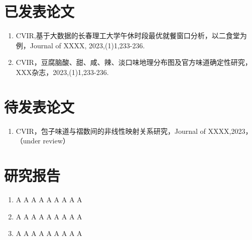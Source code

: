 
\begin{publications}

\section*{已发表论文}

\begin{enumerate}
    \item CVIR,基于大数据的长春理工大学午休时段最优就餐窗口分析，以二食堂为例，Journal of XXXX, 2023,(1)1,233-236.
    \item CVIR，豆腐脑酸、甜、咸、辣、淡口味地理分布图及官方味道确定性研究，XXX杂志，2023,(1)1,233-236.
    \end{enumerate}
    
    \section*{待发表论文}
    
    \begin{enumerate}
    \item CVIR，包子味道与褶数间的非线性映射关系研究，Journal of XXXX,2023，（under review）
    \end{enumerate}

\section*{研究报告}
\begin{enumerate}
\item A A A A A A A A A
\item A A A A A A A A A
\item A A A A A A A A A
\end{enumerate}

\end{publications}
